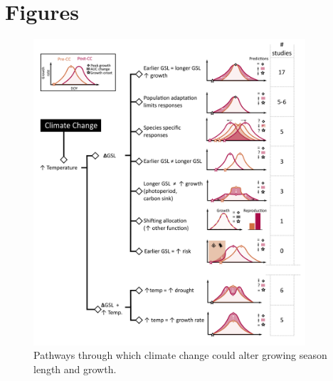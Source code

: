 \documentclass[11pt]{article}
\begin{document}

\newpage
\section{Figures}


\clearpage
\begin{figure}[h!]
\includegraphics[width=0.9\textwidth]{..//figures/hypothesesconceptfig.png}
\caption{Pathways through which climate change could alter growing season length and growth.}
\label{fig:hypotheses}
\end{figure}
\end{document}
